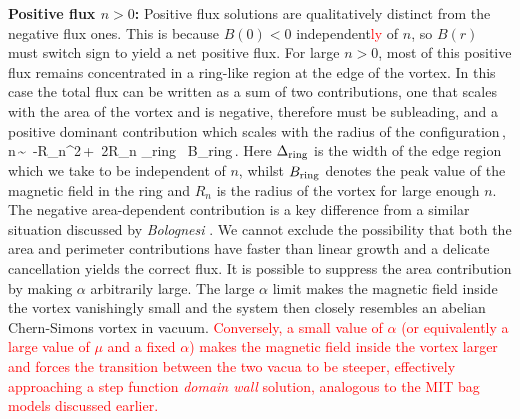 \textbf{Positive flux $n>0$:} Positive flux solutions are qualitatively distinct from the negative flux ones.  This is because $B(0)<0$ independent\textcolor{red}{ly} of $n$, so 
$B(r)$ must switch sign to yield a net positive flux.  For large $n>0$, most of this positive flux remains concentrated in a ring-like region at the edge of the vortex. In this case the total flux can be written as a sum of two contributions, one that scales with the area of the vortex and is negative, therefore must be subleading, and a positive dominant contribution which scales with the radius of the configuration\,,
\pi n\,\sim\, -\pi R_n^2\,+\, 2\pi R_n \Delta_{\rm ring} \, B_{\rm ring}\,.\label{ringansatz}
\ee
Here $\Delta_{\rm ring}$ is the width of the  edge region which we take to be independent of $n$, whilst 
$B_{\rm ring}$
denotes the peak value of the magnetic field in the ring and $R_n$ 
is the radius of the vortex for large enough $n$. The negative area-dependent contribution  is a key difference from a similar situation discussed by \textit{Bolognesi} \cite{Bolognesi:2007ez}.  We cannot exclude the possibility that both the area and perimeter 
contributions have faster than linear growth and a delicate cancellation yields the correct flux. It is possible to suppress the area contribution by making $\alpha$ arbitrarily large. The large $\alpha$ limit makes the magnetic field inside the vortex vanishingly small and the system then closely resembles an abelian Chern-Simons vortex in vacuum. \textcolor{red}{Conversely, a small value of  $\alpha$ (or equivalently a large value of $\mu$ and a fixed $\alpha$) makes the magnetic field inside the vortex larger and forces the transition between the two vacua to be steeper, effectively approaching a step function \textit{domain wall} solution, analogous to the MIT bag models discussed earlier.}
